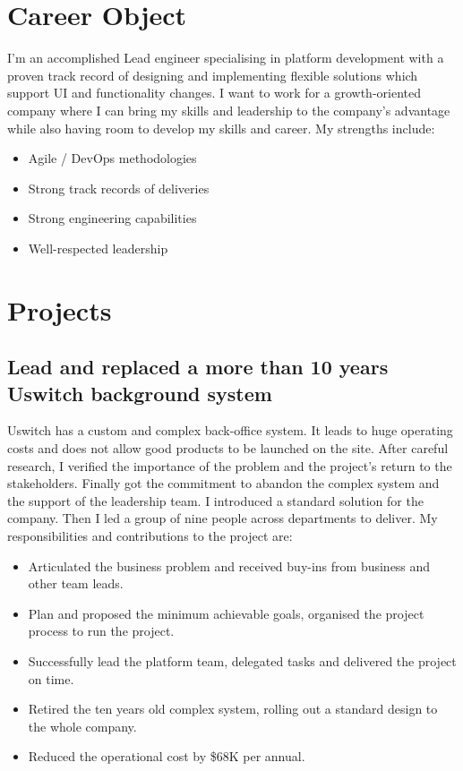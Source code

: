 \documentclass[a4paper]{twentysecondcv-english} %
\begin{document}
\section{Career Object}

I'm an accomplished Lead engineer specialising in platform development with a proven track record of designing and implementing flexible solutions which support UI and functionality changes. I want to work for a growth-oriented company where I can bring my skills and leadership to the company's advantage while also having room to develop my skills and career. My strengths include:
\begin{itemize}
  \item Agile / DevOps methodologies
  \item Strong track records of deliveries
  \item Strong engineering capabilities
  \item Well-respected leadership
\end{itemize}

\section{Projects}

\subsection{Lead and replaced a more than 10 years Uswitch background system}

Uswitch has a custom and complex back-office system. It leads to huge operating costs and does not allow good products to be launched on the site. After careful research, I verified the importance of the problem and the project's return to the stakeholders. Finally got the commitment to abandon the complex system and the support of the leadership team. I introduced a standard solution for the company. Then I led a group of nine people across departments to deliver. My responsibilities and contributions to the project are:
\begin{itemize}
    \item Articulated the business problem and received buy-ins from business and other team leads.
    \item Plan and proposed the minimum achievable goals, organised the project process to run the project.
    \item Successfully lead the platform team, delegated tasks and delivered the project on time.
    \item Retired the ten years old complex system, rolling out a standard design to the whole company.
    \item Reduced the operational cost by \$68K per annual.
\end{itemize}
\end{document}
